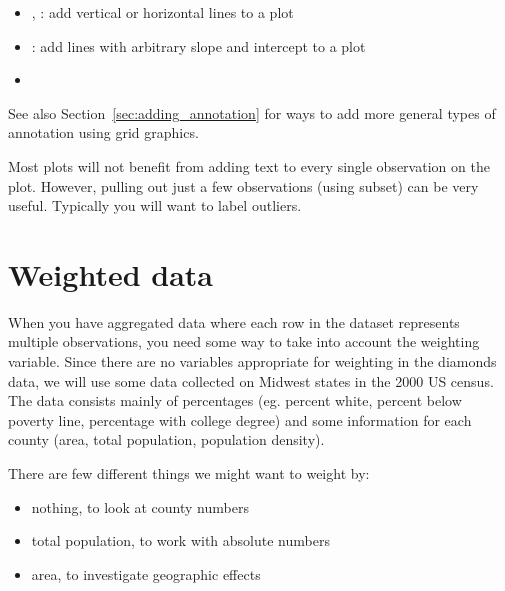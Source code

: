\begin{itemize}
  \item {}, : add vertical or horizontal lines to a plot
  \item {}: add lines with arbitrary slope and intercept to a plot
  \item {}
\end{itemize}

See also Section~\ref{sec:adding_annotation} for ways to add more general types of annotation using grid graphics.

Most plots will not benefit from adding text to every single observation on the plot.  However, pulling out just a few observations (using subset) can be very useful.  Typically you will want to label outliers.



\section{Weighted data}
\label{sec:weighting}


When you have aggregated data where each row in the dataset represents multiple observations, you need some way to take into account the weighting variable.  Since there are no variables appropriate for weighting in the diamonds data, we will use some data collected on Midwest states in the 2000 US census.  The data consists mainly of percentages (eg. percent white, percent below poverty line, percentage with college degree) and some information for each county (area, total population, population density).

There are few different things we might want to weight by: 

\begin{itemize}
  \item nothing, to look at county numbers
  \item total population, to work with absolute numbers
  \item area, to investigate geographic effects
\end{itemize}


